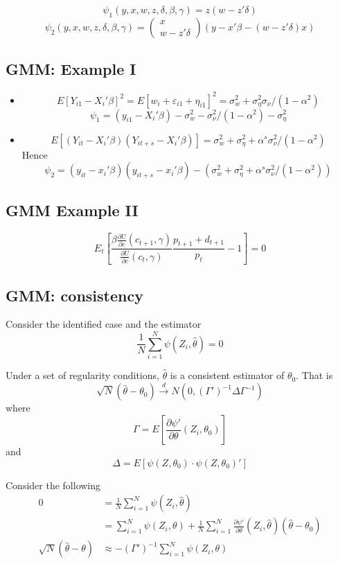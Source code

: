 \documentclass[11pt, a4paper, oneside]{article}
\theoremstyle{definition}
\theoremstyle{proposition}
\theoremstyle{corollary}
\theoremstyle{lemma}
\theoremstyle{theorem}
\begin{document}
$$\psi_1(y, x, w, z, \delta, \beta, \gamma) =z(w - z'\delta)$$
$$\psi_2(y, x, w, z, \delta, \beta, \gamma) = \begin{pmatrix} x \\ w - z'\delta\end{pmatrix}(y - x'\beta-(w-z'\delta)x)$$ 

\subsection{GMM: Example I}
\begin{itemize}
\item $$E[Y_{i1}-X_i'\beta]^2 = E[w_i+\varepsilon_{i1} + \eta_{i1}]^2 = \sigma_w^2+\sigma^2_{\eta} \sigma_{\nu}/(1-\alpha^2)$$ 
$$\psi_1 = (y_{i1} - X_i'\beta) - \sigma^2_{w} - \sigma^2_{\nu}/(1-\alpha^2) - \sigma^2_{\eta}$$
\item $$E[(Y_{it}-X_i'\beta)(Y_{it+s}-X_i'\beta)] = \sigma^2_w + \sigma_{\eta}^2 +\alpha^s \sigma_{\nu}^2/(1-\alpha^2)$$
Hence $$\psi_2  = (y_{it}-x_i'\beta)(y_{it+s}-x_i'\beta) - (\sigma^2_w + \sigma_{\eta}^2 +\alpha^s \sigma_{\nu}^2/(1-\alpha^2))$$
\end{itemize}

\subsection{GMM Example II}
$$E_t\left[\frac{\beta\frac{\partial U}{\partial c}(c_{t+1}, \gamma)}{\frac{\partial U}{\partial c}(c_t, \gamma)}\frac{p_{t+1}+d_{t+1}}{p_t} - 1\right]=0$$

\subsection{GMM: consistency}
Consider the identified case and the estimator 
\[
\frac{1}{N}\sum_{i=1}^N \psi(Z_i, \hat{\theta}) = 0
\]

Under a set of regularity conditions, $\hat{\theta}$ is a consistent estimator of $\theta_0$. That is
\[
\sqrt{N}(\hat{\theta} -\theta_0) \overset{d}{\to} N(0, (\Gamma')^{-1}\Delta\Gamma^{-1})
\]
where 
$$\Gamma = E\left[\frac{\partial \psi'}{\partial \theta}(Z_i, \theta_0)\right]$$ and
$$\Delta = E[\psi(Z, \theta_0)\cdot \psi(Z, \theta_0)']$$

Consider the following
\begin{align*}
0 &=\frac{1}{N}\sum_{i=1}^N \psi(Z_i, \hat{\theta}) \\
&=\sum_{i=1}^N \psi(Z_i, \theta) + \frac{1}{N}\sum_{i=1}^N\frac{\partial \psi'}{\partial \theta}(Z_i, \hat{\theta})(\hat{\theta} - \theta_0)\\
\sqrt{N}(\hat{\theta}-\theta) &\approx -(\Gamma')^{-1}\sum_{i=1}^N\psi(Z_i, \theta)
\end{align*}
\end{document}
